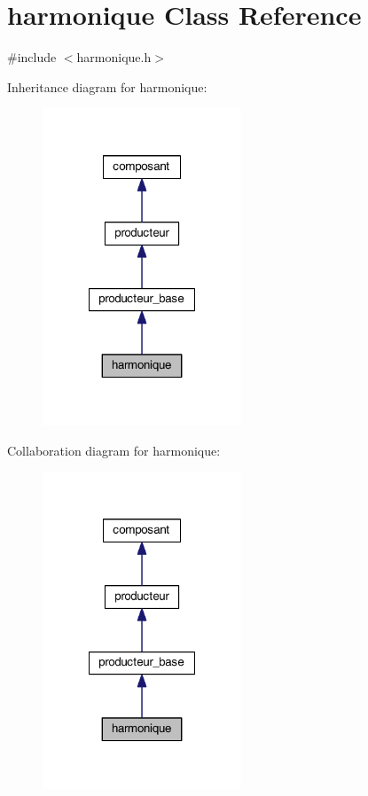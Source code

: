 \hypertarget{classharmonique}{\section{harmonique Class Reference}
\label{classharmonique}
}


{\ttfamily \#include $<$harmonique.\-h$>$}



Inheritance diagram for harmonique\-:
\nopagebreak
\begin{figure}[H]
\begin{center}
\leavevmode
\includegraphics[width=168pt]{classharmonique__inherit__graph}
\end{center}
\end{figure}


Collaboration diagram for harmonique\-:
\nopagebreak
\begin{figure}[H]
\begin{center}
\leavevmode
\includegraphics[width=168pt]{classharmonique__coll__graph}
\end{center}
\end{figure}
